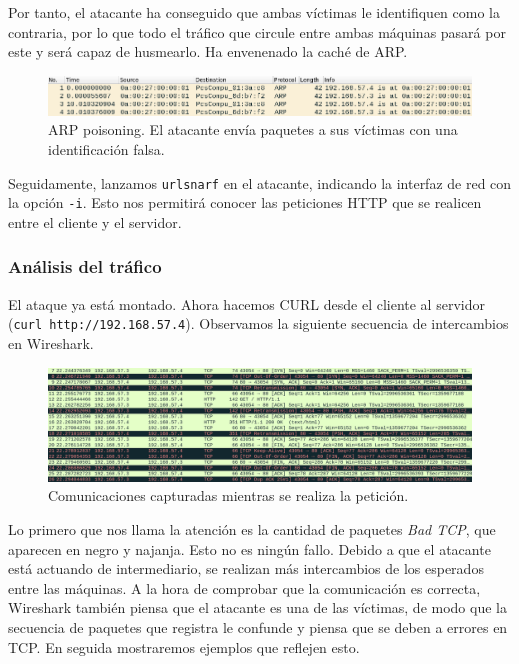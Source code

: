 \documentclass[11pt]{article}
\begin{document}
Por tanto, el atacante ha conseguido que ambas víctimas le identifiquen como la contraria, por lo que todo el tráfico que circule entre ambas máquinas pasará por este y será capaz de husmearlo. Ha envenenado la caché de ARP.

\begin{figure}[H]
	\centering
	\includegraphics[width=140mm]{images/atack1/wireshark-arp}
	\caption{ARP poisoning. El atacante envía paquetes a sus víctimas con una identificación falsa.}
	\label{fig:wireshark-arp}
\end{figure}

Seguidamente, lanzamos \texttt{urlsnarf} en el atacante, indicando la interfaz de red con la opción \texttt{-i}. Esto nos permitirá
conocer las peticiones HTTP que se realicen entre el cliente y el servidor.

\subsubsection*{Análisis del tráfico}

El ataque ya está montado. Ahora hacemos CURL desde el cliente al servidor (\verb|curl http://192.168.57.4|).
Observamos la siguiente secuencia de intercambios en Wireshark.

\begin{figure}[H]
	\centering
	\includegraphics[width=170mm]{images/atack1/request}
	\caption{Comunicaciones capturadas mientras se realiza la petición.}
	\label{fig:request}
\end{figure}

Lo primero que nos llama la atención es la cantidad de paquetes \emph{Bad TCP}, que aparecen en negro y najanja. Esto
no es ningún fallo. Debido a que el atacante está actuando de intermediario, se realizan más intercambios de los esperados
entre las máquinas. A la hora de comprobar que la comunicación es correcta, Wireshark también piensa que el atacante es
una de las víctimas, de modo que la secuencia de paquetes que registra le confunde y piensa que se deben a errores en TCP. En 
seguida mostraremos ejemplos que reflejen esto.
\end{document}
